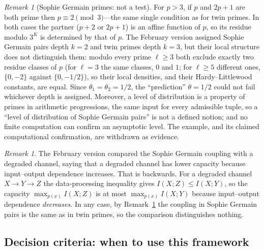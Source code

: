 \documentclass[12pt]{amsart}
\theoremstyle{plain}
\theoremstyle{definition}
\theoremstyle{remark}
\newtheorem{remark}[theorem]{Remark}
\begin{document}
\begin{remark}[Sophie Germain primes: not a test]
\label{rem:sg}
For $p > 3$, if $p$ and $2p+1$ are both prime then $p \equiv 2 \pmod{3}$---the
same single condition as for twin primes. In both cases the partner ($p + 2$
or $2p + 1$) is an affine function of $p$, so its residue modulo $3^K$ is
determined by that of $p$. The February version assigned Sophie Germain pairs
depth $k = 2$ and twin primes depth $k = 3$, but their local structure does not
distinguish them: modulo every prime $\ell \geq 3$ both exclude exactly two
residue classes of $p$ (for $\ell = 3$ the same classes, $0$ and $1$; for
$\ell \geq 5$ different ones, $\{0, -2\}$ against $\{0, -1/2\}$), so their
local densities, and their Hardy--Littlewood constants, are equal.
Since $\theta_1 = \theta_2 = 1/2$, the ``prediction'' $\theta = 1/2$ could not
fail whichever depth is assigned. Moreover, a level of distribution is a
property of primes in arithmetic progressions, the same input for every
admissible tuple, so a ``level of distribution of Sophie Germain pairs'' is not
a defined notion; and no finite computation can confirm an asymptotic level.
The example, and its claimed computational confirmation, are withdrawn as
evidence.
\end{remark}

\begin{remark}
The February version compared the Sophie Germain coupling with a degraded
channel, saying that a degraded channel has lower capacity because input--output
dependence increases. That is backwards. For a degraded channel
$X \to Y \to Z$ the data-processing inequality gives
$I(X;Z) \leq I(X;Y)$, so the capacity $\max_{p(x)} I(X;Z)$ is at most
$\max_{p(x)} I(X;Y)$ because input--output dependence \emph{decreases}. In any
case, by Remark~\ref{rem:sg} the coupling in Sophie Germain pairs is the same
as in twin primes, so the comparison distinguishes nothing.
\end{remark}

\subsection{Decision criteria: when to use this framework}
\label{sec:decisioncriteria}
\end{document}
